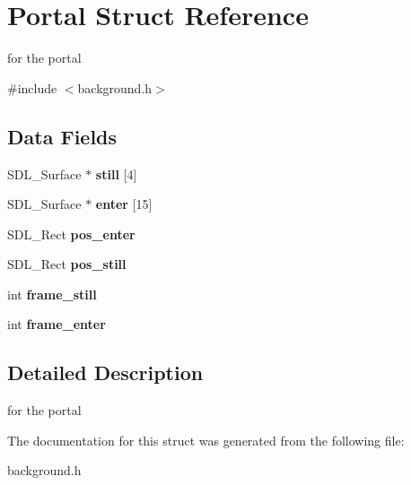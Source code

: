 \hypertarget{structPortal}{}\section{Portal Struct Reference}
\label{structPortal}


for the portal  




{\ttfamily \#include $<$background.\+h$>$}

\subsection*{Data Fields}
\begin{DoxyCompactItemize}
\item 
\mbox{\label{structPortal_a77ddecc0900365f5ca013351d32fc9ee}} 
S\+D\+L\+\_\+\+Surface $\ast$ {\bfseries still} \mbox{[}4\mbox{]}
\item 
\mbox{\label{structPortal_ab57554378c76f1c1d35022280aa250a1}} 
S\+D\+L\+\_\+\+Surface $\ast$ {\bfseries enter} \mbox{[}15\mbox{]}
\item 
\mbox{\label{structPortal_a241b257fc05abc880eca67c0db1e52ea}} 
S\+D\+L\+\_\+\+Rect {\bfseries pos\+\_\+enter}
\item 
\mbox{\label{structPortal_a3cfcaf2bd0b3f229a073b7e7f1f2dc08}} 
S\+D\+L\+\_\+\+Rect {\bfseries pos\+\_\+still}
\item 
\mbox{\label{structPortal_ab3181fde5c8374c3c461f824b948221f}} 
int {\bfseries frame\+\_\+still}
\item 
\mbox{\label{structPortal_a5aab8cbcf440db0c100ab2e8fb267bf8}} 
int {\bfseries frame\+\_\+enter}
\end{DoxyCompactItemize}


\subsection{Detailed Description}
for the portal 

The documentation for this struct was generated from the following file\+:\begin{DoxyCompactItemize}
\item 
background.\+h\end{DoxyCompactItemize}
